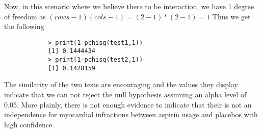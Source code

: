 \documentclass[11pt]{article}
\begin{document}
\begin{enumerate}
\begin{enumerate}
		Now, in this scenario where we believe there to be interaction, we have 1 degree of freedom as $(rows-1)(cols-1) = (2-1)*(2-1)=1$ Thus we get the following
		\begin{verbatim}
			> print(1-pchisq(test1,1))
			[1] 0.1444434
			> print(1-pchisq(test2,1))
			[1] 0.1428159
		\end{verbatim}
		The similarity of the two tests are encouraging and the values they display indicate that we can not reject the null hypothesis assuming an alpha level of 0.05. More plainly, there is not enough evidence to indicate that their is not an independence for myocardial infractions between aspirin usage and placebos with high confidence.
\end{enumerate}
\end{enumerate}
\end{document}
